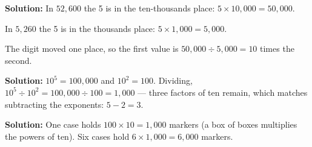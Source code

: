 \documentclass[12pt]{article}
\begin{document}

\textbf{Solution:} In $52{,}600$ the 5 is in the ten-thousands place:
$5 \times 10{,}000 = 50{,}000$. 

In $5{,}260$ the 5 is in the thousands place: $5 \times 1{,}000 = 5{,}000$.

The digit moved one place, so the first value is $50{,}000 \div 5{,}000 = 10$
times the second. 


\textbf{Solution:} $10^5 = 100{,}000$ and $10^2 = 100$. Dividing,
$10^5 \div 10^2 = 100{,}000 \div 100 = 1{,}000$ — three factors of ten remain,
which matches subtracting the exponents: $5 - 2 = 3$. 


\textbf{Solution:} One case holds $100 \times 10 = 1{,}000$ markers (a box of
boxes multiplies the powers of ten). Six cases hold
$6 \times 1{,}000 = 6{,}000$ markers. 
\end{document}
